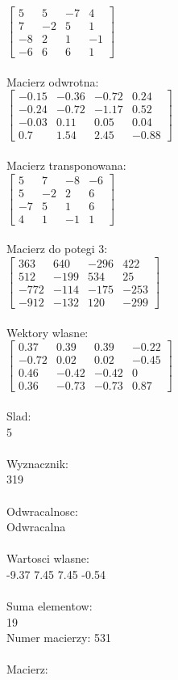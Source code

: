 \documentclass[a4paper,12pt]{article}
\begin{document}
$\begin{bmatrix} 5&5&-7&4\\7&-2&5&1\\-8&2&1&-1\\-6&6&6&1 \end{bmatrix}$
\\
\\
Macierz odwrotna:\\

$\begin{bmatrix} -0.15&-0.36&-0.72&0.24\\-0.24&-0.72&-1.17&0.52\\-0.03&0.11&0.05&0.04\\0.7&1.54&2.45&-0.88 \end{bmatrix}$
\\
\\
Macierz transponowana:\\

$\begin{bmatrix} 5&7&-8&-6\\5&-2&2&6\\-7&5&1&6\\4&1&-1&1 \end{bmatrix}$
\\
\\
Macierz do potegi 3:\\

$\begin{bmatrix} 363&640&-296&422\\512&-199&534&25\\-772&-114&-175&-253\\-912&-132&120&-299 \end{bmatrix}$
\\
\\
Wektory wlasne:\\

$\begin{bmatrix} 0.37&0.39&0.39&-0.22\\-0.72&0.02&0.02&-0.45\\0.46&-0.42&-0.42&0\\0.36&-0.73&-0.73&0.87 \end{bmatrix}$
\\
\\
Slad:\\
5
\\
\\
Wyznacznik:\\
319
\\
\\
Odwracalnosc:\\
Odwracalna
\\
\\
Wartosci wlasne:\\
-9.37 7.45 7.45 -0.54
\\
\\
Suma elementow:\\
19
\\
\newpage
Numer macierzy:
531
\\
\\
Macierz:\\
\end{document}
